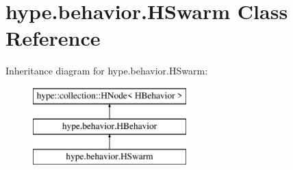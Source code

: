 \hypertarget{classhype_1_1behavior_1_1_h_swarm}{\section{hype.\-behavior.\-H\-Swarm Class Reference}
\label{classhype_1_1behavior_1_1_h_swarm}
}
Inheritance diagram for hype.\-behavior.\-H\-Swarm\-:\begin{figure}[H]
\begin{center}
\leavevmode
\includegraphics[height=3.000000cm]{classhype_1_1behavior_1_1_h_swarm}
\end{center}
\end{figure}

